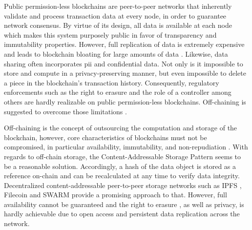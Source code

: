 Public permission-less blockchains are peer-to-peer networks that inherently validate and process transaction data at every node, in order to guarantee network consensus. By virtue of its design, all data is available at each node which makes this system purposely public in favor of transparency and immutability properties. However, full replication of data is extremely expensive and leads to blockchain bloating for large amounts of data \cite{eberhardtBlockchainInsightsOffChaining2017}. Likewise, data sharing often incorporates \acrshort{pii} and confidential data. Not only is it impossible to store and compute in a privacy-preserving manner, but even impossible to delete a piece in the blockchain's transaction history. Consequently, regulatory enforcements such as the right to erasure \cite[Art. 17]{european_commission_regulation_2016} and the role of a controller \cite[Art. 4 (7)]{european_commission_regulation_2016} among others are hardly realizable on public permission-less blockchains. Off-chaining is suggested to overcome those limitations \cite{eberhardtBlockchainInsightsOffChaining2017}.

Off-chaining is the concept of outsourcing the computation and storage of the blockchain, however, core characteristics of blockchains must not be compromised, in particular availability, immutability, and non-repudiation \cite{eberhardtOffchainingModelsApproaches2018,eberhardtBlockchainInsightsOffChaining2017}. With regards to off-chain storage, the Content-Addressable Storage Pattern \cite{eberhardtBlockchainInsightsOffChaining2017} seems to be a reasonable solution. Accordingly, a hash of the data object is stored as a reference on-chain and can be recalculated at any time to verify data integrity. Decentralized content-addressable peer-to-peer storage networks such as IPFS \cite{benetIPFSContentAddressed2014}, Filecoin \cite{filecoin} and SWARM \cite{swarm} provide a promising approach to that. However, full availability cannot be guaranteed \cite{eberhardtOffchainingModelsApproaches2018} and the right to erasure \cite[Art. 17]{european_commission_regulation_2016}, as well as privacy, is hardly achievable due to open access and persistent data replication across the network.

